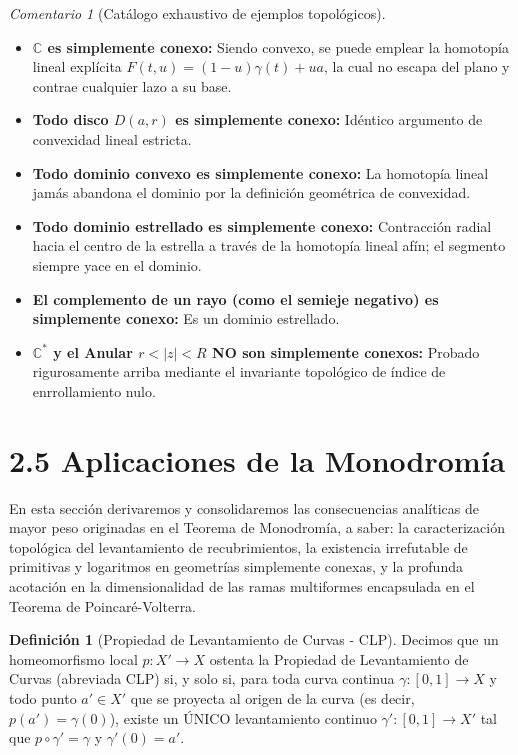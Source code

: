 \documentclass[11pt,a4paper]{article}
\theoremstyle{definition}
\newtheorem{definicion}{Definición}[section]
\theoremstyle{remark}
\newtheorem{observacion}{Comentario}[section]
\numberwithin{equation}{section}
\begin{document}
\begin{observacion}[Catálogo exhaustivo de ejemplos topológicos]
\begin{itemize}
    \item \textbf{$\mathbb{C}$ es simplemente conexo:} Siendo convexo, se puede emplear la homotopía lineal explícita $F(t,u) = (1-u)\gamma(t) + ua$, la cual no escapa del plano y contrae cualquier lazo a su base.
    \item \textbf{Todo disco $D(a,r)$ es simplemente conexo:} Idéntico argumento de convexidad lineal estricta.
    \item \textbf{Todo dominio convexo es simplemente conexo:} La homotopía lineal jamás abandona el dominio por la definición geométrica de convexidad.
    \item \textbf{Todo dominio estrellado es simplemente conexo:} Contracción radial hacia el centro de la estrella a través de la homotopía lineal afín; el segmento siempre yace en el dominio.
    \item \textbf{El complemento de un rayo (como el semieje negativo) es simplemente conexo:} Es un dominio estrellado.
    \item \textbf{$\mathbb{C}^*$ y el Anular $r < |z| < R$ NO son simplemente conexos:} Probado rigurosamente arriba mediante el invariante topológico de índice de enrrollamiento nulo.
\end{itemize}
\end{observacion}

\section{2.5 Aplicaciones de la Monodromía}

En esta sección derivaremos y consolidaremos las consecuencias analíticas de mayor peso originadas en el Teorema de Monodromía, a saber: la caracterización topológica del levantamiento de recubrimientos, la existencia irrefutable de primitivas y logaritmos en geometrías simplemente conexas, y la profunda acotación en la dimensionalidad de las ramas multiformes encapsulada en el Teorema de Poincaré-Volterra.

\begin{definicion}[Propiedad de Levantamiento de Curvas - CLP]
Decimos que un homeomorfismo local $p: X' \to X$ ostenta la Propiedad de Levantamiento de Curvas (abreviada CLP) si, y solo si, para toda curva continua $\gamma : [0,1] \to X$ y todo punto $a' \in X'$ que se proyecta al origen de la curva (es decir, $p(a') = \gamma(0)$), existe un ÚNICO levantamiento continuo $\gamma' : [0,1] \to X'$ tal que $p \circ \gamma' = \gamma$ y $\gamma'(0) = a'$.
\end{definicion}
\end{document}

